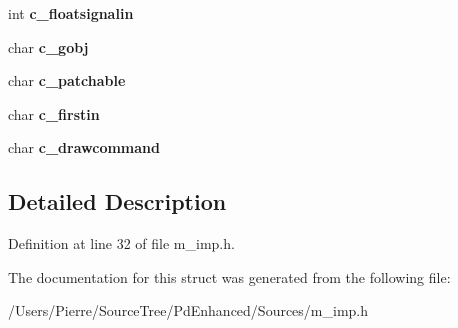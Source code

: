 \begin{DoxyCompactItemize}
\item 
\hypertarget{struct__class_abca1f1ba9be8ebb98eba730b3a6e9a0d}{int {\bfseries c\-\_\-floatsignalin}}\label{struct__class_abca1f1ba9be8ebb98eba730b3a6e9a0d}

\item 
\hypertarget{struct__class_a5a67f7289319b5e91ac4de05c0a1df80}{char {\bfseries c\-\_\-gobj}}\label{struct__class_a5a67f7289319b5e91ac4de05c0a1df80}

\item 
\hypertarget{struct__class_a916986356a3debc59d4465805d8dc3a7}{char {\bfseries c\-\_\-patchable}}\label{struct__class_a916986356a3debc59d4465805d8dc3a7}

\item 
\hypertarget{struct__class_a736f0d38b97f5109504969aecf0fe1d2}{char {\bfseries c\-\_\-firstin}}\label{struct__class_a736f0d38b97f5109504969aecf0fe1d2}

\item 
\hypertarget{struct__class_aade29b31c311a34b7942012488a9e062}{char {\bfseries c\-\_\-drawcommand}}\label{struct__class_aade29b31c311a34b7942012488a9e062}

\end{DoxyCompactItemize}


\subsection{Detailed Description}


Definition at line 32 of file m\-\_\-imp.\-h.



The documentation for this struct was generated from the following file\-:\begin{DoxyCompactItemize}
\item 
/\-Users/\-Pierre/\-Source\-Tree/\-Pd\-Enhanced/\-Sources/m\-\_\-imp.\-h\end{DoxyCompactItemize}
